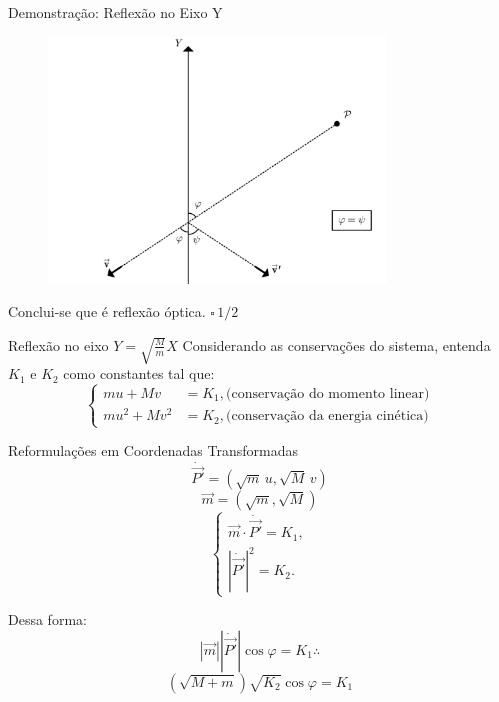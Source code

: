 \documentclass{beamer}
\begin{document}
\begin{frame}{Demonstração: Reflexão no Eixo Y}
  \begin{figure}
    \centering
    \includegraphics[width=0.8\textwidth]{images/image-4.png}
  \end{figure}
  Conclui-se que é reflexão óptica. $\square \, 1/2$ 
\end{frame}

\begin{frame}{Reflexão no eixo $Y=\sqrt{\tfrac{M}{m}}X$}
  Considerando as conservações do sistema, entenda $K_1$ e $K_2$ como constantes tal que:
  \begin{equation*}
    \begin{cases}mu+Mv&=K_1,\text{(conservação do momento linear)} \\mu^2+Mv^2&=K_2,\text{(conservação da energia cinética)} \end{cases}
  \end{equation*}
\end{frame}

\begin{frame}{Reformulações em Coordenadas Transformadas}
  $$
  \dot{\vec{P'}}=(\sqrt m\,u,\sqrt M\,v)
  $$
  $$
  \vec m=(\sqrt{m},\sqrt{M})
  $$
  \begin{equation*}
    \begin{cases}\vec m\cdot\dot{\vec{P'}}=K_1,\\|\dot{\vec{P'}}|^2=K_2.\end{cases}
  \end{equation*}

  Dessa forma:
  $$|\vec{m}| |\dot{\vec{P'}}| \cos{\varphi} = K_1 \therefore$$
  $$(\sqrt{M+m}) \sqrt{K_2} \cos{\varphi} = K_1$$
\end{frame}
\end{document}
